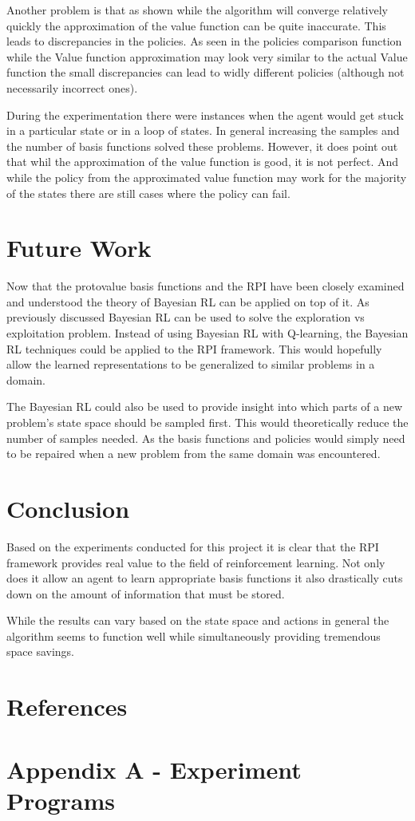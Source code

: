 \documentclass[12pt, letterpaper, final]{report}
\begin{document}
Another problem is that as shown while the algorithm will converge
relatively quickly the approximation of the value function can be
quite inaccurate. This leads to discrepancies in the policies. As seen
in the policies comparison function while the Value function
approximation may look very similar to the actual Value function the
small discrepancies can lead to widly different policies (although not
necessarily incorrect ones). 

During the experimentation there were
instances when the agent would get stuck in a particular state or in a
loop of states. In general increasing the samples and the number of
basis functions solved these problems. However, it does point out that
whil the approximation of the value function is good, it is not
perfect. And while the policy from the approximated value function may
work for the majority of the states there are still cases where the
policy can fail.

\section{Future Work}

Now that the protovalue basis functions and the RPI have been closely
examined and understood the theory of Bayesian RL can be applied on
top of it. As previously discussed Bayesian RL can be used to solve
the exploration vs exploitation problem. Instead of using Bayesian RL
with Q-learning, the Bayesian RL techniques could be applied to the
RPI framework. This would hopefully allow the learned representations
to be generalized to similar problems in a domain. 

The Bayesian RL could also be used to provide insight into which parts
of a new problem's state space should be sampled first. This would
theoretically reduce the number of samples needed. As the basis
functions and policies would simply need to be repaired when a new
problem from the same domain was encountered.

\section{Conclusion}

Based on the experiments conducted for this project it is clear that
the RPI framework provides real value to the field of reinforcement
learning. Not only does it allow an agent to learn appropriate basis
functions it also drastically cuts down on the amount of information
that must be stored.

While the results can vary based on the state space and actions in
general the algorithm seems to function well while simultaneously
providing tremendous space savings.

\section{References}

\section{Appendix A - Experiment Programs}
\end{document}
